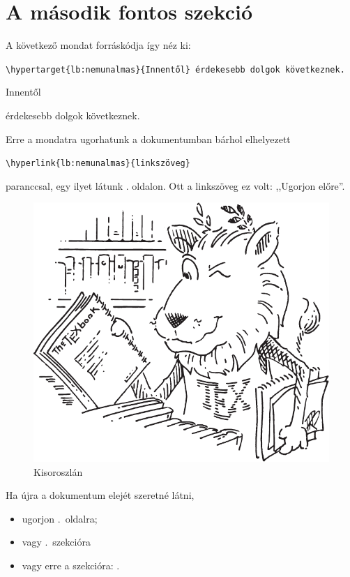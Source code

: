 \documentclass{article}
\begin{document}
\hulipsum[2]

\clearpage

\section{A második fontos szekció} \label{sec:second}

A következő mondat forráskódja így néz ki:

\verb!\hypertarget{lb:nemunalmas}{Innentől} érdekesebb dolgok következnek.!

\hypertarget{lb:nemunalmas}{Innentől} érdekesebb dolgok következnek.

Erre a mondatra ugorhatunk a dokumentumban bárhol elhelyezett

\verb!\hyperlink{lb:nemunalmas}{linkszöveg}!

paranccsal, egy ilyet látunk . oldalon. Ott a linkszöveg ez volt: ,,Ugorjon előre''.

\begin{figure}[ht]
\centering
\includegraphics[scale=0.2]{Lion.pdf}
\caption{Kisoroszlán}
\label{fig:small-lion}
\end{figure}

Ha újra a dokumentum elejét szeretné látni,
\begin{itemize}
\item ugorjon .~oldalra;
\item vagy  .~szekcióra
\item vagy erre a szekcióra: .
\end{itemize}
\end{document}
